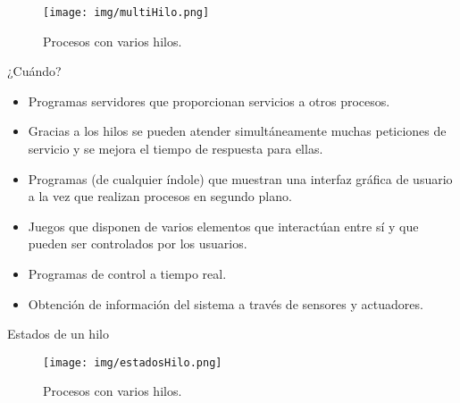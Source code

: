 \documentclass{beamer}
\begin{document}
\begin{frame}
\begin{figure}
        \centering
        \texttt{[image: img/multiHilo.png]} 
        \caption{Procesos con varios hilos.}
    \end{figure}
\end{frame}

\begin{frame}{¿Cuándo?}
\begin{itemize}
    \item Programas servidores que proporcionan servicios a otros procesos.
    \item Gracias a los hilos se pueden atender simultáneamente muchas peticiones de servicio y se
    mejora el tiempo de respuesta para ellas.
    \item Programas (de cualquier índole) que muestran una interfaz gráfica de usuario a la
    vez que realizan procesos en segundo plano.
    \item Juegos que disponen de varios elementos que interactúan entre sí y que pueden
    ser controlados por los usuarios.
    \item Programas de control a tiempo real.
    \item Obtención de información del sistema a través de sensores y actuadores.
\end{itemize}
\end{frame}

\begin{frame}{Estados de un hilo}
\begin{figure}
        \centering
        \texttt{[image: img/estadosHilo.png]} 
        \caption{Procesos con varios hilos.}
    \end{figure}
\end{frame}
\end{document}
